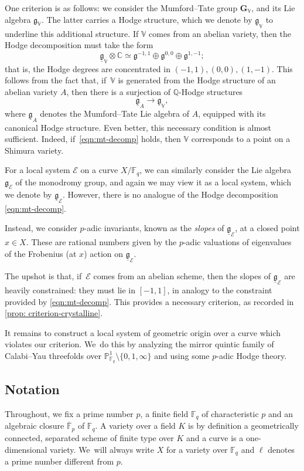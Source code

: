 \documentclass[JEP,XML,SOM,Unicode,published]{cedram}
\numberwithin{equation}{subsection}
\theoremstyle{definition}
\newcommand\Fpbar{{\overline{\mb{F}}_p}}
\let\mf\mathfrak
\let\mc\mathcal
\let\mb\mathbb
\let\mbf\mathbf
\begin{document}
One criterion is as follows: we consider the Mumford--Tate group $\mbf{G}_{\mb{V}}$, and its Lie algebra $\mf{g}_{\mb{V}}$. The latter carries a Hodge structure, which we denote by $\underline{\mf{g}}_{\mb{V}}$ to underline this additional structure. If $\mb{V}$ comes from an abelian variety, then the Hodge decomposition must take the form
\begin{equation}\label{eqn:mt-decomp}
\underline{\mf{g}}_{\mb{V}}\otimes \mb{C}\simeq \mf{g}^{-1,1}\oplus \mf{g}^{0,0}\oplus \mf{g}^{1,-1};
\end{equation}
that is, the Hodge degrees are concentrated in $(-1,1), (0,0), (1,-1)$. This follows from the fact that, if~$\mb{V}$ is generated from the Hodge structure of an abelian variety $A$, then there is a surjection of $\mb{Q}$-Hodge structures
\[
\underline{\mf{g}}_A\rightarrow \underline{\mf{g}}_{\mb{V}},
\]
where $\underline{\mf{g}}_A$ denotes the Mumford--Tate Lie algebra of $A$, equipped with its canonical Hodge structure. Even better, this necessary condition is almost sufficient. Indeed, if~\eqref{eqn:mt-decomp} holds, then $\mb{V}$ corresponds to a point on a Shimura variety.

For a local system $\mc{E}$ on a curve $X/\mb{F}_q$, we can similarly consider the Lie algebra~$\mf{g}_{\mc{E}}$ of the monodromy group, and again we may view it as a local system, which we denote by $\underline{\mf{g}}_{\mc{E}}$. However, there is no analogue of the Hodge decomposition \eqref{eqn:mt-decomp}.

Instead, we consider $p$-adic invariants, known as the \emph{slopes} of $\underline{\mf{g}}_{\mc{E}}$, at a closed point $x\in X$. These are rational numbers given by the $p$-adic valuations of eigenvalues of the Frobenius (at $x$) action on $\underline{\mf{g}}_{\mc{E}}$.

The upshot is that, if~$\mc{E}$ comes from an abelian scheme, then the slopes of $\underline{\mf{g}}_{\mc{E}}$ are heavily constrained: they must lie in $[-1, 1]$, in analogy to the constraint provided by \eqref{eqn:mt-decomp}. This provides a necessary criterion, as recorded in \cref{prop: criterion-crystalline}.

It remains to construct a local system of geometric origin over a curve which violates our criterion. We~do this by analyzing the mirror quintic family of Calabi--Yau threefolds over $\mb{P}^1_{\mb{F}_q}\setminus \{0,1,\infty\}$ and using some $p$-adic Hodge theory.

\subsection{Notation}
Throughout, we fix a prime number $p$, a finite field $\mathbb{F}_q$ of characteristic $p$ and an algebraic closure $\Fpbar$ of $\mathbb{F}_q$. A variety over a field $K$ is by definition a geometrically connected, separated scheme of finite type over $K$ and a curve is a one-dimensional variety. We~will always write $X$ for a variety over $\mathbb{F}_q$ and $\ell$ denotes a prime number different from $p$.
\end{document}
